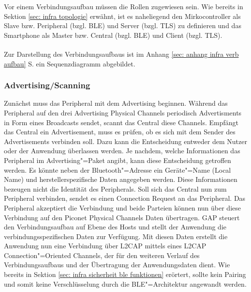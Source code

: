 Vor einem Verbindungsaufbau müssen die Rollen zugewiesen sein. Wie bereits in Sektion \ref{sec: infra topologie} erwähnt, ist es naheliegend den Mirkocontroller als Slave bzw. Peripheral (bzgl. BLE) und Server (bzgl. TLS) zu definieren und das Smartphone als Master bzw. Central (bzgl. BLE) und Client (bzgl. TLS).
\\\\
Zur Darstellung des Verbindungsaufbaus ist im Anhang \ref{sec: anhang infra verb aufbau} S. \pageref{sec: anhang infra verb aufbau} ein Sequenzdiagramm abgebildet.

\subsubsection{Advertising/Scanning}
Zunächst muss das Peripheral mit dem Advertising beginnen. Während das Peripheral auf den drei Advertising Physical Channels periodisch Advertisments in Form eines Broadcasts sendet, scannt das Central diese Channels. Empfängt das Central ein Advertisement, muss es prüfen, ob es sich mit dem Sender des Advertisements verbinden soll. Dazu kann die Entscheidung entweder dem Nutzer oder der Anwendung überlassen werden. Je nachdem, welche Informationen das Peripheral im Advertising"=Paket angibt, kann diese Entscheidung getroffen werden. Es könnte neben der Bluetooth"=Adresse ein Geräte"=Name (Local Name) und herstellerspezifische Daten angegeben werden. Diese Informationen bezeugen nicht die Identität des Peripherals. Soll sich das Central nun zum Peripheral verbinden, sendet es einen Connection Request an das Peripheral. Das Peripheral akzeptiert die Verbindung und beide Parteien können nun über diese Verbindung auf den Piconet Physical Channels Daten übertragen. GAP steuert den Verbindungsaufbau auf Ebene des Hosts und stellt der Anwendung die verbindungsspezifischen Daten zur Verfügung. Mit diesen Daten erstellt die Anwendung nun eine Verbindung über L2CAP mittels eines L2CAP Connection"=Oriented Channels, der für den weiteren Verlauf des Verbindungsaufbaus und der Übertragung der Anwendungsdaten dient. Wie bereits in Sektion \ref{sec: infra sicherheit ble funktionen} erörtert, sollte kein Pairing und somit keine Verschlüsselung durch die BLE"=Architektur angewandt werden.

